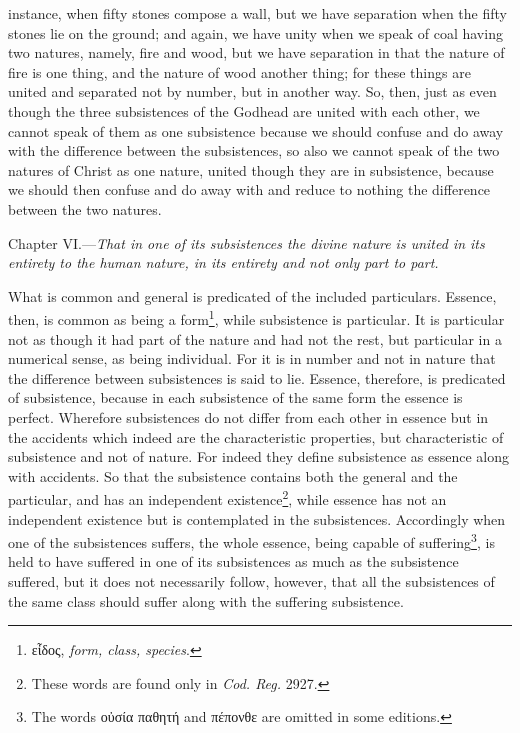 instance, when fifty stones compose a wall, but we have separation when the fifty stones lie on the ground; and again, we have unity when we speak of coal having two natures, namely, fire and wood, but we have separation in that the nature of fire is one thing, and the nature of wood another thing; for these things are united and separated not by number, but in another way. So, then, just as even though the three subsistences of the Godhead are united with each other, we cannot speak of them as one subsistence because we should confuse and do away with the difference between the subsistences, so also we cannot speak of the two natures of Christ as one nature, united though they are in subsistence, because we should then confuse and do away with and reduce to nothing the difference between the two natures.


Chapter VI.—\emph{That in one of its subsistences the divine nature is united in its entirety to the human nature, in its entirety and not only part to part.}

What is common and general is predicated of the included particulars. Essence, then, is common as being a form\footnote{\textgreek{εἶδος}, \emph{form, class, species}.}, while subsistence is particular. It is particular not as though it had part of the nature and had not the rest, but particular in a numerical sense, as being individual. For it is in number and not in nature that the difference between subsistences is said to lie. Essence, therefore, is predicated of subsistence, because in each subsistence of the same form the essence is perfect. Wherefore subsistences do not differ from each other in essence but in the accidents which indeed are the characteristic properties, but characteristic of subsistence and not of nature. For indeed they define subsistence as essence along with accidents. So that the subsistence contains both the general and the particular, and has an independent existence\footnote{These words are found only in \emph{Cod. Reg. }2927.}, while essence has not an independent existence but is contemplated in the subsistences. Accordingly when one of the subsistences suffers, the whole essence, being capable of suffering\footnote{The words \textgreek{οὐσία παθητή} and \textgreek{πέπονθε} are omitted in some editions.}, is held to have suffered in one of its subsistences as much as the subsistence suffered, but it does not necessarily follow, however, that all the subsistences of the same class should suffer along with the suffering subsistence.

